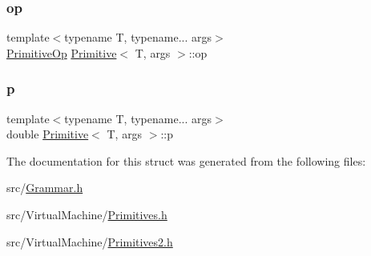 \subsubsection{\texorpdfstring{op}{op}}
{\footnotesize\ttfamily template$<$typename T, typename... args$>$ \\
\hyperlink{_instruction_8h_a227278394efd1e2313c727102db09ea9}{Primitive\+Op} \hyperlink{struct_primitive}{Primitive}$<$ T, args $>$\+::op}

\mbox{\label{struct_primitive_a43fac47ebf8ec63a70443d80dcd04687}} 
\subsubsection{\texorpdfstring{p}{p}}
{\footnotesize\ttfamily template$<$typename T, typename... args$>$ \\
double \hyperlink{struct_primitive}{Primitive}$<$ T, args $>$\+::p}



The documentation for this struct was generated from the following files\+:\begin{DoxyCompactItemize}
\item 
src/\hyperlink{_grammar_8h}{Grammar.\+h}\item 
src/\+Virtual\+Machine/\hyperlink{_primitives_8h}{Primitives.\+h}\item 
src/\+Virtual\+Machine/\hyperlink{_primitives2_8h}{Primitives2.\+h}\end{DoxyCompactItemize}
